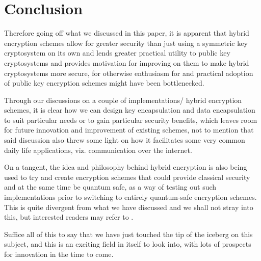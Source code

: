 \section{Conclusion}

\label{sec:conclusion}

Therefore going off what we discussed in this paper, it is apparent that hybrid encryption schemes allow for greater security than just using a symmetric key cryptosystem on its own and lends greater practical utility to public key cryptosystems and provides motivation for improving on them to make hybrid cryptosystems more secure, for otherwise enthusiasm for and practical adoption of public key encryption schemes might have been bottlenecked.

Through our discussions on a couple of implementations/ hybrid encryption schemes, it is clear how we can design key encapsulation and data encapsulation to suit particular needs or to gain particular security benefits, which leaves room for future innovation and improvement of existing schemes, not to mention that said discussion also threw some light on how it facilitates some very common daily life applications, viz. communication over the internet.

On a tangent, the idea and philosophy behind hybrid encryption is also being used to try and create encryption schemes that could provide classical security and at the same time be quantum safe, as a way of testing out such implementations prior to switching to entirely quantum-safe encryption schemes.
This is quite divergent from what we have discussed and we shall not stray into this, but interested readers may refer to \cite{csahybrid}.

Suffice all of this to say that we have just touched the tip of the iceberg on this subject, and this is an exciting field in itself to look into, with lots of prospects for innovation in the time to come.

